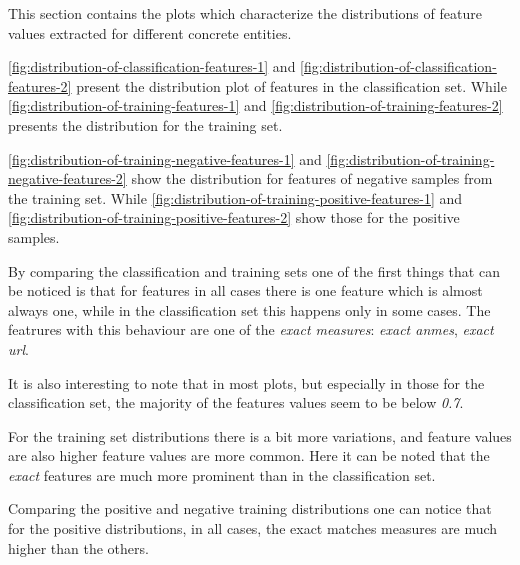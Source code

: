 \documentclass[epsfig,a4paper,11pt,titlepage,twoside,openany]{book}
\begin{document}


This section contains the plots which characterize the distributions of feature values extracted for different concrete entities. 

\autoref{fig:distribution-of-classification-features-1} and \autoref{fig:distribution-of-classification-features-2} present the distribution plot of features in the classification set. While \autoref{fig:distribution-of-training-features-1} and \autoref{fig:distribution-of-training-features-2} presents the distribution for the training set.

\autoref{fig:distribution-of-training-negative-features-1} and \autoref{fig:distribution-of-training-negative-features-2} show the distribution for features of negative samples from the training set. While \autoref{fig:distribution-of-training-positive-features-1} and \autoref{fig:distribution-of-training-positive-features-2} show those for the positive samples.

By comparing the classification and training sets one of the first things that can be noticed is that for features in all cases there is one feature which is almost always one, while in the classification set this happens only in some cases. The featrures with this behaviour are one of the \textit{exact measures}: \textit{exact anmes}, \textit{exact url}.

It is also interesting to note that in most plots, but especially in those for the classification set, the majority of the features values seem to be below \textit{0.7}.

For the training set distributions there is a bit more variations, and feature values are also higher feature values are more common. Here it can be noted that the \textit{exact} features are much more prominent than in the classification set. 

Comparing the positive and negative training distributions one can notice that for the positive distributions, in all cases, the exact matches measures are much higher than the others.

\end{document}
